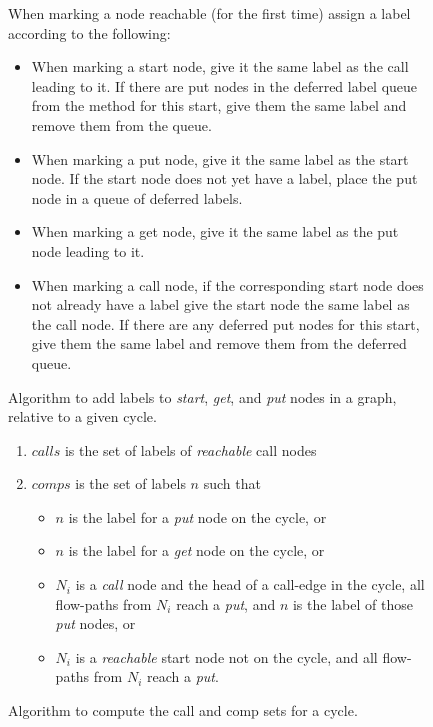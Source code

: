 \documentclass[12pt]{article}%
\begin{document}
\begin{figure}
\begin{shaded}
When marking a node reachable (for the first time) assign a label according to the following:

\begin{itemize}
\item When marking a start node, give it the same label as the call leading to it.
If there are put nodes in the deferred label queue from the method for this start, give them the same label and remove them from the queue.
\item When marking a put node, give it the same label as the start node. If the start node does not yet have a label,
place the put node in a queue of deferred labels.
\item When marking a get node, give it the same label as the put node leading to it. %
\item When marking a call node, if the corresponding start node does not already have a label give the start node
the same label as the call node. If there are any deferred put nodes for this start, give them the same label and remove them from the deferred queue.
\end{itemize}
\end{shaded}
\caption{\label{label-analysis}
Algorithm to add labels to \emph{start}, \emph{get}, and \emph{put} nodes in a graph, relative to a given cycle.}
\end{figure}


\begin{figure}
\begin{shaded}
\begin{enumerate}
\item $calls$ is  the set of labels of \emph{reachable} call nodes
\item $comps$ is the set of labels ${n}$ such that 
\begin{itemize}
\item ${n}$ is the label for a \emph{put} node on the cycle, or
\item ${n}$ is the label for a \emph{get} node on the cycle, or 
\item $N_i$ is a \emph{call} node and the head of a call-edge in the cycle, all  flow-paths from $N_i$ reach a \emph{put}, and ${n}$ is the label of those \emph{put} nodes, or
\item $N_i$ is a \emph{reachable} start node not on the cycle, and all flow-paths from $N_i$ reach a \emph{put}.
\end{itemize}
\end{enumerate}
\end{shaded}
\caption{\label{call-comps-analysis}
Algorithm to compute the call and comp sets for a cycle.}
\end{figure}
\end{document}
